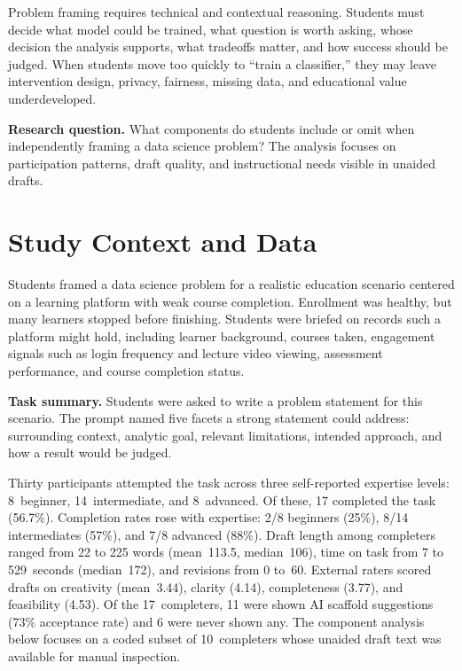 \documentclass[sigconf,screen,anonymous]{acmart}
\begin{document}
Problem framing requires technical and contextual reasoning. Students must decide what model could be trained, what question is worth asking, whose decision the analysis supports, what tradeoffs matter, and how success should be judged. When students move too quickly to ``train a classifier,'' they may leave intervention design, privacy, fairness, missing data, and educational value underdeveloped.

\textbf{Research question.} What components do students include or omit when independently framing a data science problem? The analysis focuses on participation patterns, draft quality, and instructional needs visible in unaided drafts.

\section{Study Context and Data}
Students framed a data science problem for a realistic education scenario centered on a learning platform with weak course completion. Enrollment was healthy, but many learners stopped before finishing. Students were briefed on records such a platform might hold, including learner background, courses taken, engagement signals such as login frequency and lecture video viewing, assessment performance, and course completion status.

\noindent\textbf{Task summary.} Students were asked to write a problem statement for this scenario. The prompt named five facets a strong statement could address: surrounding context, analytic goal, relevant limitations, intended approach, and how a result would be judged.

Thirty participants attempted the task across three self-reported expertise levels: 8~beginner, 14~intermediate, and 8~advanced. Of these, 17 completed the task (56.7\%). Completion rates rose with expertise: 2/8 beginners (25\%), 8/14 intermediates (57\%), and 7/8 advanced (88\%). Draft length among completers ranged from 22 to 225 words (mean~113.5, median~106), time on task from 7 to 529~seconds (median~172), and revisions from 0 to~60. External raters scored drafts on creativity (mean~3.44), clarity (4.14), completeness (3.77), and feasibility (4.53). Of the 17~completers, 11 were shown AI scaffold suggestions (73\% acceptance rate) and 6 were never shown any. The component analysis below focuses on a coded subset of 10~completers whose unaided draft text was available for manual inspection.
\end{document}
